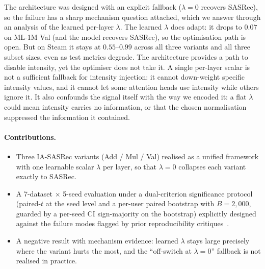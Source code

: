 The architecture was designed with an explicit fallback
($\lambda{=}0$ recovers SASRec), so the failure has a sharp
mechanism question attached, which we answer through an analysis of
the learned per-layer $\lambda$. The learned $\lambda$ does adapt: it
drops to $0.07$ on ML-1M Val (and the model recovers SASRec), so the
optimisation path is open. But on Steam it stays at $0.55$--$0.99$
across all three variants and all three subset sizes, even as test
metrics degrade. The architecture provides a path to disable intensity, yet the optimiser does not take it. A
single per-layer scalar is not a sufficient fallback for
intensity injection: it cannot down-weight specific intensity values,
and it cannot let some attention heads use intensity while others
ignore it. It also confounds the signal itself with the way we encoded
it: a flat $\lambda$ could mean intensity carries no information, or
that the chosen normalisation suppressed the information it contained.

\paragraph{Contributions.}
\begin{itemize}
\item Three IA-SASRec variants (Add / Mul / Val) realised as a
unified framework with one learnable scalar $\lambda$ per layer, so
that $\lambda{=}0$ collapses each variant exactly to SASRec.
\item A 7-dataset $\times$ 5-seed evaluation under a dual-criterion
significance protocol (paired-$t$ at the seed level and a per-user
paired bootstrap with $B{=}2{,}000$, guarded by a per-seed CI
sign-majority on the bootstrap) explicitly designed against
the failure modes flagged by prior reproducibility critiques~\citep{ferrari2019,sun2020daisy}.
\item A negative result with mechanism evidence: learned $\lambda$
stays large precisely where the variant hurts the most, and the
``off-switch at $\lambda{=}0$'' fallback is not realised in
practice.
\end{itemize}
